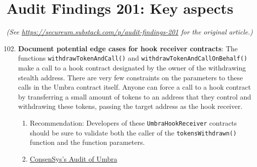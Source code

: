 \section{Audit Findings 201: Key aspects}

\textit{(See \url{https://secureum.substack.com/p/audit-findings-201} for the original article.)}\\

\begin{enumerate}
\setcounter{enumi}{101}
\item\textbf{Document potential edge cases for hook receiver contracts}: The functions \verb|withdrawTokenAndCall()| and \verb|withdrawTokenAndCallOnBehalf()| make a call to a hook contract designated by the owner of the withdrawing stealth address. There are very few constraints on the parameters to these calls in the Umbra contract itself. Anyone can force a call to a hook contract by transferring a small amount of tokens to an address that they control and withdrawing these tokens, passing the target address as the hook receiver.
	\begin{enumerate}
	\item Recommendation: Developers of these \verb|UmbraHookReceiver| contracts should be sure to validate both the caller of the \verb|tokensWithdrawn()| function and the function parameters.
	\item\href{https://consensys.net/diligence/audits/2021/03/umbra-smart-contracts/\#document-potential-edge-cases-for-hook-receiver-contracts}{ConsenSys's Audit of Umbra}
	\end{enumerate}


\end{enumerate}
